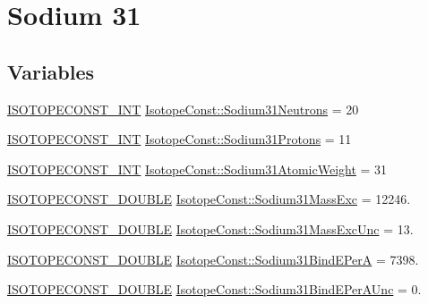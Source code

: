 \hypertarget{group___isotope_const-_sodium-_na31}{}\section{Sodium 31}
\label{group___isotope_const-_sodium-_na31}
\subsection*{Variables}
\begin{DoxyCompactItemize}
\item 
\mbox{\hyperlink{group___isotope_const-_macros_ga5f18360b3e99483a35c32d789e62621c}{I\+S\+O\+T\+O\+P\+E\+C\+O\+N\+S\+T\+\_\+\+I\+NT}} \mbox{\hyperlink{group___isotope_const-_sodium-_na31_gaca60d584869a77d3853cc10d1398445a}{Isotope\+Const\+::\+Sodium31\+Neutrons}} = 20
\item 
\mbox{\hyperlink{group___isotope_const-_macros_ga5f18360b3e99483a35c32d789e62621c}{I\+S\+O\+T\+O\+P\+E\+C\+O\+N\+S\+T\+\_\+\+I\+NT}} \mbox{\hyperlink{group___isotope_const-_sodium-_na31_ga1b1d1c5f18cd32015dd044a0d09aefb7}{Isotope\+Const\+::\+Sodium31\+Protons}} = 11
\item 
\mbox{\hyperlink{group___isotope_const-_macros_ga5f18360b3e99483a35c32d789e62621c}{I\+S\+O\+T\+O\+P\+E\+C\+O\+N\+S\+T\+\_\+\+I\+NT}} \mbox{\hyperlink{group___isotope_const-_sodium-_na31_ga870a1e89de90cf785b7af761cbeb4395}{Isotope\+Const\+::\+Sodium31\+Atomic\+Weight}} = 31
\item 
\mbox{\hyperlink{group___isotope_const-_macros_ga8f45a7272ce02c0b4c65c44636ed719a}{I\+S\+O\+T\+O\+P\+E\+C\+O\+N\+S\+T\+\_\+\+D\+O\+U\+B\+LE}} \mbox{\hyperlink{group___isotope_const-_sodium-_na31_gadbd4089ae9cac1f7e757d8f723cc6eec}{Isotope\+Const\+::\+Sodium31\+Mass\+Exc}} = 12246.
\item 
\mbox{\hyperlink{group___isotope_const-_macros_ga8f45a7272ce02c0b4c65c44636ed719a}{I\+S\+O\+T\+O\+P\+E\+C\+O\+N\+S\+T\+\_\+\+D\+O\+U\+B\+LE}} \mbox{\hyperlink{group___isotope_const-_sodium-_na31_ga6ecea77d2a99a16903a7762577293f32}{Isotope\+Const\+::\+Sodium31\+Mass\+Exc\+Unc}} = 13.
\item 
\mbox{\hyperlink{group___isotope_const-_macros_ga8f45a7272ce02c0b4c65c44636ed719a}{I\+S\+O\+T\+O\+P\+E\+C\+O\+N\+S\+T\+\_\+\+D\+O\+U\+B\+LE}} \mbox{\hyperlink{group___isotope_const-_sodium-_na31_gaaf3299923322c54336cb5167edc2c76c}{Isotope\+Const\+::\+Sodium31\+Bind\+E\+PerA}} = 7398.
\item 
\mbox{\hyperlink{group___isotope_const-_macros_ga8f45a7272ce02c0b4c65c44636ed719a}{I\+S\+O\+T\+O\+P\+E\+C\+O\+N\+S\+T\+\_\+\+D\+O\+U\+B\+LE}} \mbox{\hyperlink{group___isotope_const-_sodium-_na31_gac7c40b0c3308191f5c06cca51b3c0e79}{Isotope\+Const\+::\+Sodium31\+Bind\+E\+Per\+A\+Unc}} = 0.

\end{DoxyCompactItemize}
